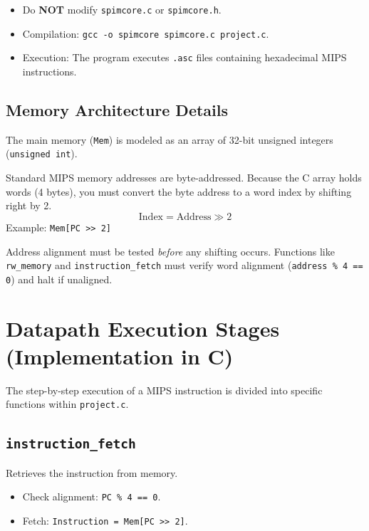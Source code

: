 \begin{itemize}
    \item Do \textbf{NOT} modify \texttt{spimcore.c} or \texttt{spimcore.h}.
    \item Compilation: \texttt{gcc -o spimcore spimcore.c project.c}.
    \item Execution: The program executes \texttt{.asc} files containing hexadecimal MIPS instructions.
\end{itemize}

\subsection{Memory Architecture Details}

\begin{vocabulary}
The main memory (\texttt{Mem}) is modeled as an array of 32-bit unsigned integers (\texttt{unsigned int}).
\end{vocabulary}

\begin{proposition}
Standard MIPS memory addresses are byte-addressed. Because the C array holds words (4 bytes), you must convert the byte address to a word index by shifting right by 2.
\begin{equation}
\text{Index} = \text{Address} \gg 2
\end{equation}
Example: \texttt{Mem[PC >> 2]}
\end{proposition}

\begin{remark}
Address alignment must be tested \textit{before} any shifting occurs. Functions like \texttt{rw\_memory} and \texttt{instruction\_fetch} must verify word alignment (\texttt{address \% 4 == 0}) and halt if unaligned.
\end{remark}

\section{Datapath Execution Stages (Implementation in C)}

The step-by-step execution of a MIPS instruction is divided into specific functions within \texttt{project.c}.

\subsection{\texttt{instruction\_fetch}}
Retrieves the instruction from memory.
\begin{itemize}
    \item Check alignment: \texttt{PC \% 4 == 0}.
    \item Fetch: \texttt{Instruction = Mem[PC >> 2]}.
\end{itemize}

